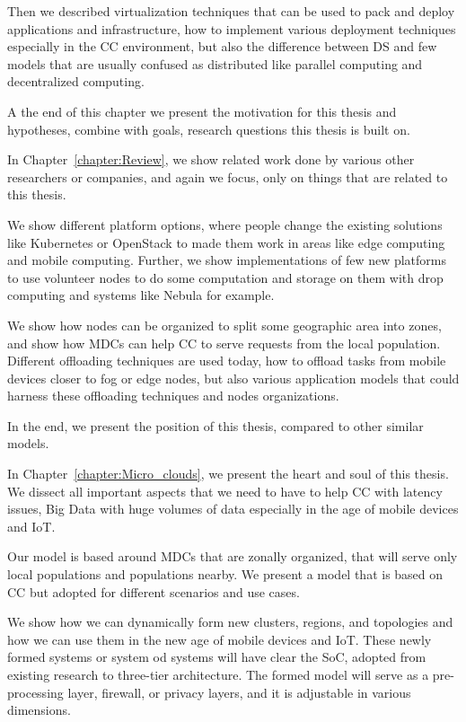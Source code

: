 Then we described virtualization techniques that can be used to pack and deploy applications and infrastructure, how to implement various deployment techniques especially in the CC environment, but also the difference between DS and few models that are usually confused as distributed like parallel computing and decentralized computing.

A the end of this chapter we present the motivation for this thesis and hypotheses, combine with goals, research questions this thesis is built on.

In Chapter~\ref{chapter:Review}, we show related work done by various other researchers or companies, and again we focus, only on things that are related to this thesis.

We show different platform options, where people change the existing solutions like Kubernetes or OpenStack to made them work in areas like edge computing and mobile computing. Further, we show implementations of few new platforms to use volunteer nodes to do some computation and storage on them with drop computing and systems like Nebula for example.

We show how nodes can be organized to split some geographic area into zones, and show how MDCs can help CC to serve requests from the local population. Different offloading techniques are used today, how to offload tasks from mobile devices closer to fog or edge nodes, but also various application models that could harness these offloading techniques and nodes organizations.

In the end, we present the position of this thesis, compared to other similar models.

In Chapter~\ref{chapter:Micro_clouds}, we present the heart and soul of this thesis. We dissect all important aspects that we need to have to help CC with latency issues, Big Data with huge volumes of data especially in the age of mobile devices and IoT.

Our model is based around MDCs that are zonally organized, that will serve only local populations and populations nearby. We present a model that is based on CC but adopted for different scenarios and use cases.

We show how we can dynamically form new clusters, regions, and topologies and how we can use them in the new age of mobile devices and IoT. These newly formed systems or system od systems will have clear the SoC, adopted from existing research to three-tier architecture. The formed model will serve as a pre-processing layer, firewall, or privacy layers, and it is adjustable in various dimensions.

